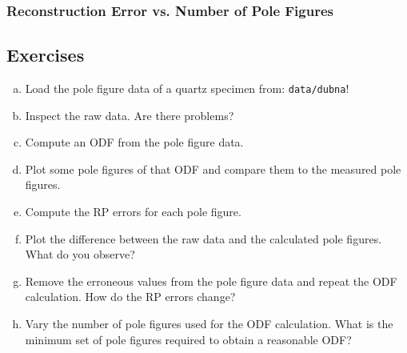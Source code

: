 \begin{frame}
  \frametitle{Reconstruction Error vs. Number of Pole Figures}


\end{frame}

\subsection*{Exercises}

\begin{frame}

  \begin{Exercise}
    \begin{enumerate}[a)]
    \item Load the pole figure data of a quartz specimen from:
      \texttt{data/dubna}!
    \item Inspect the raw data. Are there problems?
    \item Compute an ODF from the pole figure data.
    \item Plot some pole figures of that ODF and compare them to the measured
      pole figures.
    \item Compute the RP errors for each pole figure.
    \item Plot the difference between the raw data and the calculated pole
      figures. What do you observe?
    \item Remove the erroneous values from the pole figure data and repeat the
      ODF calculation. How do the RP errors change?
    \item Vary the number of pole figures used for the ODF calculation. What
      is the minimum set of pole figures required to obtain a reasonable ODF?
    \end{enumerate}
  \end{Exercise}

\end{frame}



